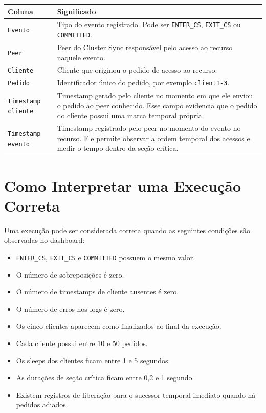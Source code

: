 \documentclass[12pt,a4paper]{article}
\begin{document}
\begin{longtable}{>{\raggedright\arraybackslash}p{4cm} >{\raggedright\arraybackslash}p{10cm}}
\toprule
\textbf{Coluna} & \textbf{Significado} \\
\midrule
\texttt{Evento} &
Tipo do evento registrado. Pode ser \texttt{ENTER\_CS}, \texttt{EXIT\_CS} ou
\texttt{COMMITTED}. \\
\texttt{Peer} &
Peer do Cluster Sync respons\'avel pelo acesso ao recurso naquele evento. \\
\texttt{Cliente} &
Cliente que originou o pedido de acesso ao recurso. \\
\texttt{Pedido} &
Identificador \'unico do pedido, por exemplo \texttt{client1-3}. \\
\texttt{Timestamp cliente} &
Timestamp gerado pelo cliente no momento em que ele enviou o pedido ao peer conhecido. Esse
campo evidencia que o pedido do cliente possui uma marca temporal pr\'opria. \\
\texttt{Timestamp evento} &
Timestamp registrado pelo peer no momento do evento no recurso. Ele permite observar a ordem
temporal dos acessos e medir o tempo dentro da se\c{c}\~ao cr\'itica. \\
\bottomrule
\end{longtable}

\section{Como Interpretar uma Execu\c{c}\~ao Correta}

Uma execu\c{c}\~ao pode ser considerada correta quando as seguintes condi\c{c}\~oes s\~ao
observadas no dashboard:

\begin{itemize}
    \item \texttt{ENTER\_CS}, \texttt{EXIT\_CS} e \texttt{COMMITTED} possuem o mesmo valor.
    \item O n\'umero de sobreposi\c{c}\~oes \'e zero.
    \item O n\'umero de timestamps de cliente ausentes \'e zero.
    \item O n\'umero de erros nos logs \'e zero.
    \item Os cinco clientes aparecem como finalizados ao final da execu\c{c}\~ao.
    \item Cada cliente possui entre 10 e 50 pedidos.
    \item Os sleeps dos clientes ficam entre 1 e 5 segundos.
    \item As dura\c{c}\~oes de se\c{c}\~ao cr\'itica ficam entre 0,2 e 1 segundo.
    \item Existem registros de libera\c{c}\~ao para o sucessor temporal imediato quando h\'a
    pedidos adiados.
\end{itemize}
\end{document}
